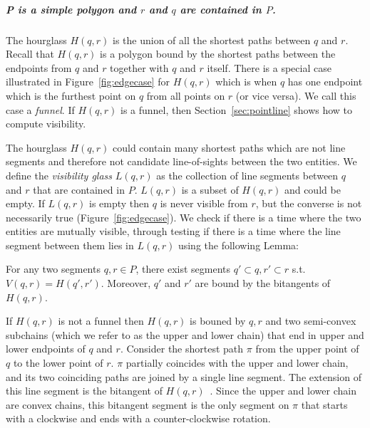 \documentclass[a4paper, UKenglish]{lipics-v2018}
\begin{document}
%
\subparagraph{P is a simple polygon and $r$ and $q$ are contained in $P$.}
The hourglass $H(q, r)$ is the union of all the shortest paths between $q$ and $r$. 
Recall that $H(q,r)$ is a polygon bound by the shortest paths between the endpoints from $q$ and $r$ together with $q$ and $r$ itself. There is a special case illustrated in Figure~\ref{fig:edgecase} for $H(q,r)$ which is when $q$ has one endpoint which is the furthest point on $q$ from all points on $r$ (or vice versa). We call this case a \emph{funnel}. If $H(q,r)$ is a funnel, then Section~\ref{sec:pointline} shows how to compute visibility.

The hourglass $H(q, r)$ could contain many shortest paths which are not line segments and therefore not candidate line-of-sights between the two entities. We define the \emph{visibility glass} $L(q,r)$ as the collection of line segments between $q$ and $r$ that are contained in $P$. $L(q,r)$ is a subset of $H(q,r)$ and could be empty. If $L(q,r)$ is empty then $q$ is never visible from $r$, but the converse is not necessarily true (Figure~\ref{fig:edgecase}). We check if there is a time where the two entities are mutually visible, through testing if there is a time where the line segment between them lies in $L(q,r)$ using the following Lemma:

\begin{lemma}
For any two segments $q, r \in P$, there exist segments $q' \subset q, r' \subset r$ s.t. $V(q, r) = H(q', r')$. Moreover, $q'$ and $r'$ are bound by the bitangents of $H(q, r)$.
\end{lemma}

If $H(q,r)$ is not a funnel then $H(q,r)$ is bouned by $q, r$ and two semi-convex subchains (which we refer to as the upper and lower chain) that end in upper and lower endpoints of $q$ and $r$. Consider the shortest path $\pi$ from the upper point of $q$ to the lower point of $r$. $\pi$ partially coincides with the upper and lower chain, and its two coinciding paths are joined by a single line segment. The extension of this line segment is the bitangent of $H(q,r)$~\cite{FRANK}. Since the upper and lower chain are convex chains, this bitangent segment is the only segment on $\pi$ that starts with a clockwise and ends with a counter-clockwise rotation. 
\end{document}
